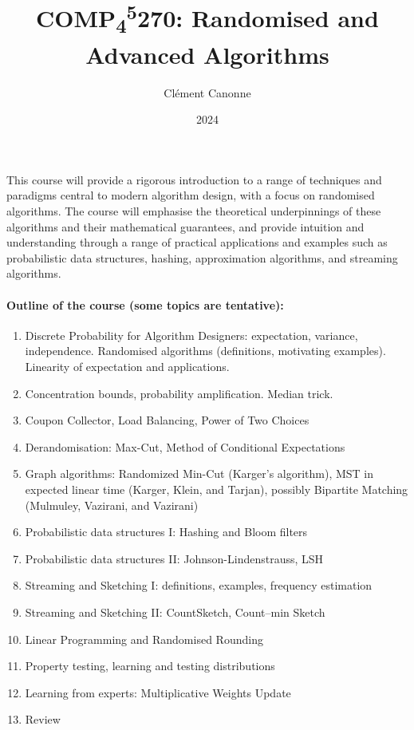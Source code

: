 \documentclass[a4paper]{tufte-book}
\title{COMP\textsubscript{4}\textsuperscript{5}270: Randomised and Advanced Algorithms}
\author{Cl\'ement Canonne}
\date{2024}
\begin{document}
\frontmatter
\maketitle
This course will provide a rigorous introduction to a range of techniques and paradigms central to modern algorithm design, with a focus on randomised algorithms. The course will 
emphasise the theoretical underpinnings of these algorithms and their mathematical guarantees, and provide intuition and understanding through a range of practical applications and examples such as probabilistic data structures, hashing, approximation algorithms, and streaming algorithms.


\paragraph{Outline of the course (some topics are tentative):}
\begin{enumerate}
    \item Discrete Probability for Algorithm Designers: expectation, variance, independence. Randomised algorithms (definitions, motivating examples). Linearity of expectation and applications.
    \item Concentration bounds, probability amplification. Median trick.
    \item Coupon Collector, Load Balancing, Power of Two Choices
    \item Derandomisation: Max-Cut, Method of Conditional Expectations
    \item Graph algorithms: Randomized Min-Cut (Karger’s algorithm), MST in expected linear time (Karger, Klein, and Tarjan), possibly Bipartite Matching (Mulmuley, Vazirani, and Vazirani)
    \item Probabilistic data structures I: Hashing and Bloom filters
    \item Probabilistic data structures II: Johnson-Lindenstrauss, LSH
    \item Streaming and Sketching I: definitions, examples, frequency estimation
    \item Streaming and Sketching II: CountSketch, Count–min Sketch
    \item Linear Programming and Randomised Rounding
    \item Property testing, learning and testing distributions
    \item Learning from experts: Multiplicative Weights Update
    \item Review
\end{enumerate}
\bgroup\small
\tableofcontents
\egroup
\listoffigures
\end{document}
